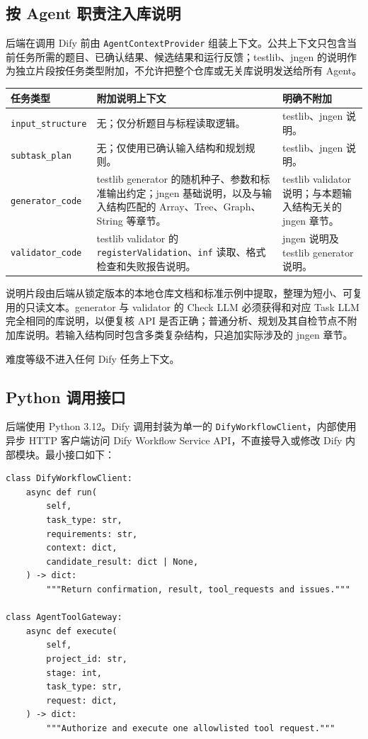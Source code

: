 \documentclass[UTF8,zihao=-4]{ctexart}
\begin{document}
\subsection{按 Agent 职责注入库说明}

后端在调用 Dify 前由 \texttt{AgentContextProvider} 组装上下文。公共上下文只包含当前任务所需的题目、已确认结果、候选结果和运行反馈；testlib、jngen 的说明作为独立片段按任务类型附加，不允许把整个仓库或无关库说明发送给所有 Agent。

\begin{longtable}{p{3.4cm}p{5.1cm}p{5.4cm}}
\toprule
任务类型 & 附加说明上下文 & 明确不附加 \\
\midrule
\footnotesize\texttt{input\_structure} & 无；仅分析题目与标程读取逻辑。 & testlib、jngen 说明。 \\
\footnotesize\texttt{subtask\_plan} & 无；仅使用已确认输入结构和规划规则。 & testlib、jngen 说明。 \\
\footnotesize\texttt{generator\_code} & testlib generator 的随机种子、参数和标准输出约定；jngen 基础说明，以及与输入结构匹配的 Array、Tree、Graph、String 等章节。 & testlib validator 说明；与本题输入结构无关的 jngen 章节。 \\
\footnotesize\texttt{validator\_code} & testlib validator 的 \texttt{registerValidation}、\texttt{inf} 读取、格式检查和失败报告说明。 & jngen 说明及 testlib generator 说明。 \\
\bottomrule
\end{longtable}

说明片段由后端从锁定版本的本地仓库文档和标准示例中提取，整理为短小、可复用的只读文本。generator 与 validator 的 Check LLM 必须获得和对应 Task LLM 完全相同的库说明，以便复核 API 是否正确；普通分析、规划及其自检节点不附加库说明。若输入结构同时包含多类复杂结构，只追加实际涉及的 jngen 章节。

难度等级不进入任何 Dify 任务上下文。

\subsection{Python 调用接口}

后端使用 Python 3.12。Dify 调用封装为单一的 \texttt{DifyWorkflowClient}，内部使用异步 HTTP 客户端访问 Dify Workflow Service API，不直接导入或修改 Dify 内部模块。最小接口如下：

\begin{lstlisting}
class DifyWorkflowClient:
    async def run(
        self,
        task_type: str,
        requirements: str,
        context: dict,
        candidate_result: dict | None,
    ) -> dict:
        """Return confirmation, result, tool_requests and issues."""

class AgentToolGateway:
    async def execute(
        self,
        project_id: str,
        stage: int,
        task_type: str,
        request: dict,
    ) -> dict:
        """Authorize and execute one allowlisted tool request."""
\end{lstlisting}
\end{document}
